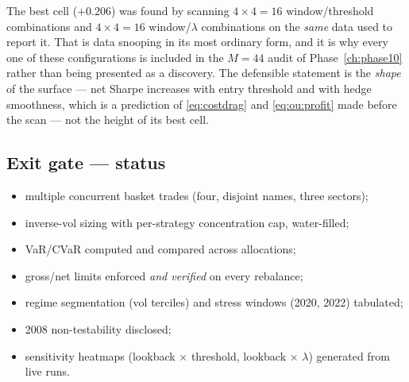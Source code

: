 \begin{remark}
The best cell ($+0.206$) was found by scanning $4\times4=16$ window/threshold
combinations and $4\times4=16$ window/$\lambda$ combinations on the \emph{same} data used
to report it. That is data snooping in its most ordinary form, and it is why every one of
these configurations is included in the $M=44$ audit of Phase~\ref{ch:phase10} rather than
being presented as a discovery. The defensible statement is the \emph{shape} of the
surface --- net Sharpe increases with entry threshold and with hedge smoothness, which is
a prediction of \eqref{eq:costdrag} and \eqref{eq:ou:profit} made before the scan --- not
the height of its best cell.
\end{remark}

\subsection{Exit gate --- status}

\begin{itemize}
  \item[\checkmark] multiple concurrent basket trades (four, disjoint names, three sectors);
  \item[\checkmark] inverse-vol sizing with per-strategy concentration cap, water-filled;
  \item[\checkmark] VaR/CVaR computed and compared across allocations;
  \item[\checkmark] gross/net limits enforced \emph{and verified} on every rebalance;
  \item[\checkmark] regime segmentation (vol terciles) and stress windows (2020, 2022) tabulated;
  \item[\checkmark] 2008 non-testability disclosed;
  \item[\checkmark] sensitivity heatmaps (lookback $\times$ threshold, lookback $\times$
    $\lambda$) generated from live runs.
\end{itemize}
